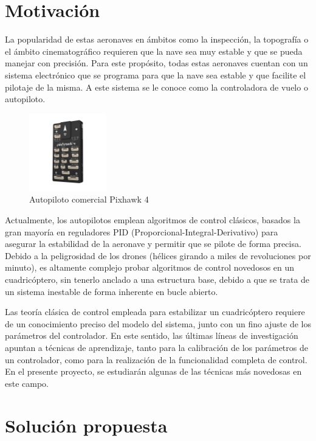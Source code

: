 \section{Motivación}

La popularidad de estas aeronaves en ámbitos como la inspección, la topografía o el ámbito cinematográfico requieren que la nave sea muy estable y que se pueda manejar con precisión. Para este propósito, todas estas aeronaves cuentan con un sistema electrónico que se programa para que la nave sea estable y que facilite el pilotaje de la misma. A este sistema se le conoce como la controladora de vuelo o autopiloto.

\begin{figure}[htb!]
	\centering
	\includegraphics[width=0.3\textwidth]{introduccion/pixhawk4.jpg}
	\caption{Autopiloto comercial Pixhawk 4}
	\label{pixhawk}
\end{figure}

Actualmente, los autopilotos emplean algoritmos de control clásicos, basados la gran mayoría en reguladores PID (Proporcional-Integral-Derivativo) para asegurar la estabilidad de la aeronave y permitir que se pilote de forma precisa. Debido a la peligrosidad de los drones (hélices girando a miles de revoluciones por minuto), es altamente complejo probar algoritmos de control novedosos en un cuadricóptero, sin tenerlo anclado a una estructura base, debido a que se trata de un sistema inestable de forma inherente en bucle abierto.

Las teoría clásica de control empleada para estabilizar un cuadricóptero requiere de un conocimiento preciso del modelo del sistema, junto con un fino ajuste de los parámetros del controlador. En este sentido, las últimas líneas de investigación apuntan a técnicas de aprendizaje, tanto para la calibración de los parámetros de un controlador, como para la realización de la funcionalidad completa de control. En el presente proyecto, se estudiarán algunas de las técnicas más novedosas en este campo.



\section{Solución propuesta}


